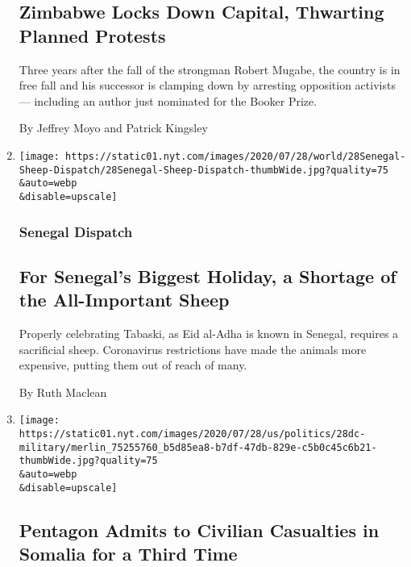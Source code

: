 \begin{enumerate}
{  \subsection{Zimbabwe Locks Down Capital, Thwarting Planned
  Protests}\label{zimbabwe-locks-down-capital-thwarting-planned-protests}}

  Three years after the fall of the strongman Robert Mugabe, the country
  is in free fall and his successor is clamping down by arresting
  opposition activists --- including an author just nominated for the
  Booker Prize.

  By Jeffrey Moyo and Patrick Kingsley
\item
  \href{/2020/07/29/world/africa/senegal-tabaski-sheep-eid-adha.html}{}

  \texttt{[image: https://static01.nyt.com/images/2020/07/28/world/28Senegal-Sheep-Dispatch/28Senegal-Sheep-Dispatch-thumbWide.jpg?quality=75\\\&auto=webp\\\&disable=upscale]}

  \hypertarget{senegal-dispatch}{%
  \subsubsection{Senegal Dispatch}\label{senegal-dispatch}}

  \hypertarget{for-senegals-biggest-holiday-a-shortage-of-the-all-important-sheep}{%
  \subsection{For Senegal's Biggest Holiday, a Shortage of the
  All-Important
  Sheep}\label{for-senegals-biggest-holiday-a-shortage-of-the-all-important-sheep}}

  Properly celebrating Tabaski, as Eid al-Adha is known in Senegal,
  requires a sacrificial sheep. Coronavirus restrictions have made the
  animals more expensive, putting them out of reach of many.

  By Ruth Maclean
\item
  \href{/2020/07/28/world/africa/pentagon-somalia-civilian-casualties.html}{}

  \texttt{[image: https://static01.nyt.com/images/2020/07/28/us/politics/28dc-military/merlin\_75255760\_b5d85ea8-b7df-47db-829e-c5b0c45c6b21-thumbWide.jpg?quality=75\\\&auto=webp\\\&disable=upscale]}

  \hypertarget{pentagon-admits-to-civilian-casualties-in-somalia-for-a-third-time}{%
  \subsection{Pentagon Admits to Civilian Casualties in Somalia for a
  Third
  Time}\label{pentagon-admits-to-civilian-casualties-in-somalia-for-a-third-time}}


\end{enumerate}
